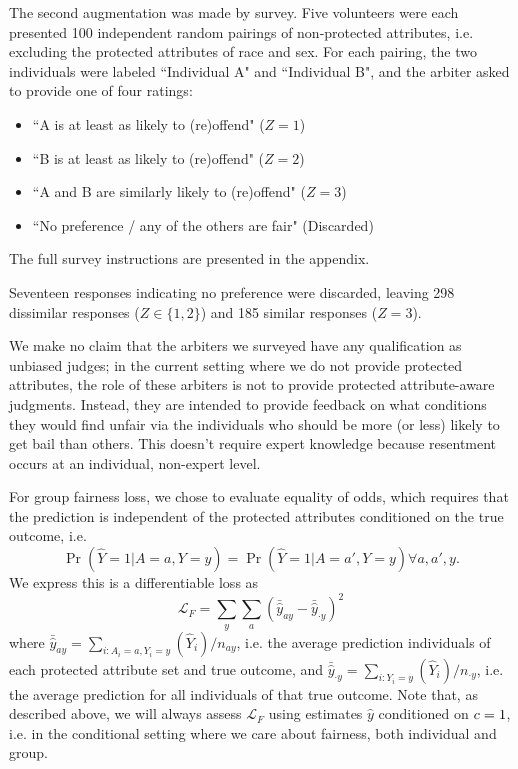         The second augmentation was made by survey.  Five volunteers were each presented 100 independent random pairings of non-protected attributes, i.e. excluding the protected attributes of race and sex.  For each pairing, the two individuals were labeled ``Individual A" and ``Individual B", and the arbiter asked to provide one of four ratings:
        \begin{itemize}
            \item ``A is at least as likely to (re)offend" ($Z = 1$)
            \item ``B is at least as likely to (re)offend" ($Z = 2$)
            \item ``A and B are similarly likely to (re)offend" ($Z = 3$)
            \item ``No preference / any of the others are fair" (Discarded)
        \end{itemize}
        The full survey instructions are presented in the appendix.
        
        Seventeen responses indicating no preference were discarded, leaving 298 dissimilar responses ($Z \in \{1, 2\}$) and 185 similar responses ($Z = 3$).

        We make no claim that the arbiters we surveyed have any qualification as unbiased judges; in the current setting where we do not provide protected attributes, the role of these arbiters is not to provide protected attribute-aware judgments.  Instead, they are intended to provide feedback on what conditions they would find unfair via the individuals who should be more (or less) likely to get bail than others.  This doesn't require expert knowledge because resentment occurs at an individual, non-expert level.

        For group fairness loss, we chose to evaluate equality of odds, which requires that the prediction is independent of the protected attributes conditioned on the true outcome, i.e.
            $$ \Pr(\hat{Y} = 1 | A = a, Y = y) = \Pr(\hat{Y} = 1 | A = a', Y = y) \forall a, a', y .$$
        We express this is a differentiable loss as 
            $$ \mathcal{L}_F = \sum\limits_{y} \sum\limits_{a} \left( \bar{\hat{y}}_{ay} - \bar{\hat{y}}_{\cdot y} \right)^2 $$
        where $\bar{\hat{y}}_{ay} = \sum_{i: A_i = a, Y_i = y}(\hat{Y}_i) / n_{ay}$, i.e. the average prediction individuals of each protected attribute set and true outcome, and $\bar{\hat{y}}_{\cdot y} = \sum_{i: Y_i = y}(\hat{Y}_i) / n_{\cdot y}$, i.e. the average prediction for all individuals of that true outcome.  Note that, as described above, we will always assess $\mathcal{L}_F$ using estimates $\hat{y}$ conditioned on $c = 1$, i.e. in the conditional setting where we care about fairness, both individual and group. 
        
